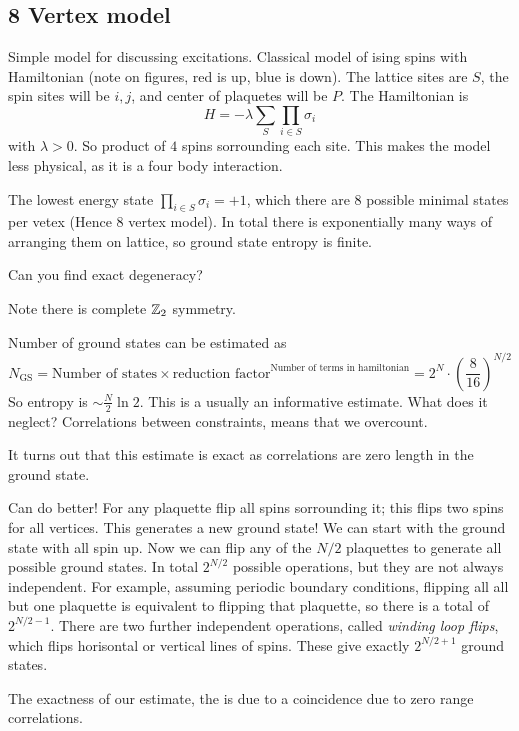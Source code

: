 \documentclass[a4paper]{article}
\begin{document}
\subsection{8 Vertex model}
Simple model for discussing excitations. Classical model of ising spins with Hamiltonian
(note on figures, red is up, blue is down). The lattice sites are $S$, the spin
sites will be $i,j$, and center of plaquetes will be $P$. The Hamiltonian is 
\[
    H=-\lambda \sum_{S}\prod_{i\in S}\sigma_i
\]
with $\lambda>0$.
So product of $4$ spins sorrounding each site. This makes the model less
physical, as it is a four body interaction.

The lowest energy state $\prod_{i\in S} \sigma_i=+1$, which there are 8 possible
minimal states per vetex (Hence 8 vertex model). In total there is exponentially
many ways of arranging them on lattice, so ground state entropy is finite. 
\begin{example}
    Can you find exact degeneracy?
\end{example}
Note there is complete $\mathbb{Z}_2$ symmetry.

\begin{example}
    Number of ground states can be estimated as 
    \[
        N_\mathrm{GS}=\text{Number of states}\times \text{reduction
            factor}^{\text{Number of terms in hamiltonian}}=
        2^N\cdot\left(\frac{8}{16}\right)^{N/2}
    \]
    So entropy is $\sim \frac{N}{2}\ln 2$. This is a usually an informative
    estimate. What does it neglect? Correlations between constraints, means that
    we overcount.
\end{example}
It turns out that this estimate is exact as correlations are zero length in the
ground state.

Can do better! For any plaquette flip all spins sorrounding it; this flips two
spins for all vertices. This generates a new ground state! We can start with the
ground state with all spin up. Now we can flip any of the $N/2$ plaquettes to
generate all possible ground states. In total $2^{N/2}$ possible operations, but
they are not always independent. For example, assuming periodic boundary
conditions, flipping all all but one plaquette is equivalent to flipping that
plaquette, so there is a total of $2^{N/2-1}$. There are two further independent
operations, called \emph{winding loop flips}, which flips horisontal or vertical
lines of spins. These give exactly $2^{N/2+1}$ ground states.

The exactness of our estimate, the is due to a coincidence due to zero range
correlations.
\end{document}
